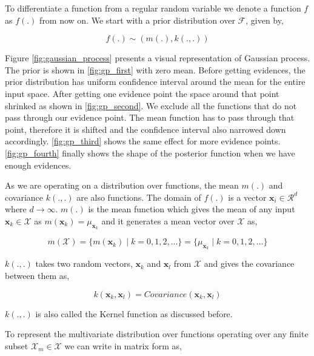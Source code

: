 \documentclass[english]{tktltiki}
\begin{document}
To differentiate a function from a regular random variable we denote a function $f$ as $f(.)$ from now on. We start with a prior distribution over $\mathcal{F}$, given by,

\begin{equation}
f(.) \sim (m(.), k(.,.))
\end{equation}

Figure \ref{fig:gaussian_process} presents a visual representation of Gaussian process. The prior is shown in \ref{fig:gp_first} with zero mean. Before getting evidences, the prior distribution has uniform confidence interval around the mean for the entire input space. After getting one evidence point the space around that point shrinked as shown in \ref{fig:gp_second}. We exclude all the functions that do not pass through our evidence point. The mean function has to pass through that point, therefore it is shifted and the confidence interval also narrowed down accordingly. \ref{fig:gp_third} shows the same effect for more evidence points. \ref{fig:gp_fourth} finally shows the shape of the posterior function when we have enough evidences.

As we are operating on a distribution over functions, the mean $m(.)$ and covariance $k(.,.)$ are also functions. The domain of $f(.)$ is a vector $\mathbf{x}_i \in \mathcal{R}^d$ where $d \to \infty$. $m(.)$ is the mean function which gives the mean of any input $\mathbf{x}_k \in \mathcal{X}$ as $m(\mathbf{x}_k) = \mu_{\mathbf{x}_k}$ and it generates a mean vector over $\mathcal{X}$ as,

$$
m(\mathcal{X}) = \{m(\mathbf{x}_k) \mid k = 0, 1, 2, ...\} = \{\mu_{\mathbf{x}_k} \mid k = 0, 1, 2, ...\} 
$$

$k(.,.)$ takes two random vectors, $\mathbf{x}_k$ and $\mathbf{x}_l$ from $\mathcal{X}$ and gives the covariance between them as,

$$
k(\mathbf{x}_k, \mathbf{x}_l) = Covariance(\mathbf{x}_k, \mathbf{x}_l)
$$

$k(.,.)$ is also called the Kernel function as discussed before.

To represent the multivariate distribution over functions operating over any finite subset $\mathcal{X}_m \in \mathcal{X}$ we can write in matrix form as,
\end{document}
